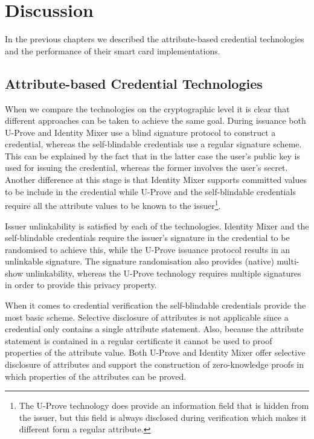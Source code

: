 \chapter{Discussion\label{chp:discussion}}

In the previous chapters we described the attribute-based credential
technologies and the performance of their smart card implementations.

\section{Attribute-based Credential Technologies}

When we compare the technologies on the cryptographic level it is clear that
different approaches can be taken to achieve the same goal. During issuance both
U-Prove and Identity Mixer use a blind signature protocol to construct a
credential, whereas the self-blindable credentials use a regular signature
scheme. This can be explained by the fact that in the latter case the user's
public key is used for issuing the credential, whereas the former involves the
user's secret. Another difference at this stage is that Identity Mixer supports
committed values to be include in the credential while U-Prove and the
self-blindable credentials require all the attribute values to be known to the
issuer\footnote{The U-Prove technology does provide an information field that
is hidden from the issuer, but this field is always disclosed during
verification which makes it different form a regular attribute.}.

Issuer unlinkability is satisfied by each of the technologies. Identity Mixer
and the self-blindable credentials require the issuer's signature in the
credential to be randomised to achieve this, while the U-Prove issuance protocol
results in an unlinkable signature. The signature randomisation also provides
(native) multi-show unlinkability, whereas the U-Prove technology requires
multiple signatures in order to provide this privacy property.

When it comes to credential verification the self-blindable credentials provide
the most basic scheme. Selective disclosure of attributes is not applicable
since a credential only contains a single attribute statement. Also, because the
attribute statement is contained in a regular certificate it cannot be used to
proof properties of the attribute value. Both U-Prove and Identity Mixer offer
selective disclosure of attributes and support the construction of
zero-knowledge proofs in which properties of the attributes can be proved.

